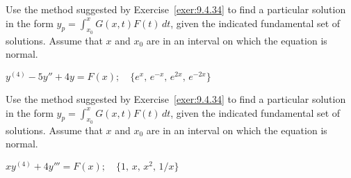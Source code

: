 \documentclass{ximera}
\begin{document}
\begin{problem}\label{exer:9.4.39}
Use the method suggested by Exercise~\ref{exer:9.4.34} to find a particular solution in the form
$y_p=\int_{x_0}^x G(x,t)F(t)\,dt$, given the indicated fundamental set of solutions.  Assume that $x$ and $x_0$ are in an interval on which
the equation is normal.

$y^{(4)}-5y''+4y=F(x); \quad \{e^x,\,e^{-x},\,e^{2x},\,e^{-2x}\}$
\end{problem}

\begin{problem}\label{exer:9.4.40}
Use the method suggested by Exercise~\ref{exer:9.4.34} to find a particular solution in the form
$y_p=\int_{x_0}^x G(x,t)F(t)\,dt$, given the indicated fundamental set of solutions.  Assume that $x$ and $x_0$ are in an interval on which
the equation is normal.

$xy^{(4)}+4y'''=F(x); \quad  \{1,\,x,\,x^2,\,1/x\}$


\end{problem}
\end{document}
